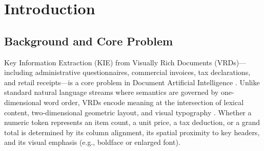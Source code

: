 \chapter{Introduction}
\label{chap:introduction}

\section{Background and Core Problem}
\label{sec:intro_overview}

Key Information Extraction (KIE) from Visually Rich Documents (VRDs)—including administrative questionnaires, commercial invoices, tax declarations, and retail receipts—is a core problem in Document Artificial Intelligence \cite{cui2021documentai}. Unlike standard natural language streams where semantics are governed by one-dimensional word order, VRDs encode meaning at the intersection of lexical content, two-dimensional geometric layout, and visual typography \cite{xu2020layoutlm,huang2022layoutlmv3}. Whether a numeric token represents an item count, a unit price, a tax deduction, or a grand total is determined by its column alignment, its spatial proximity to key headers, and its visual emphasis (e.g., boldface or enlarged font).

